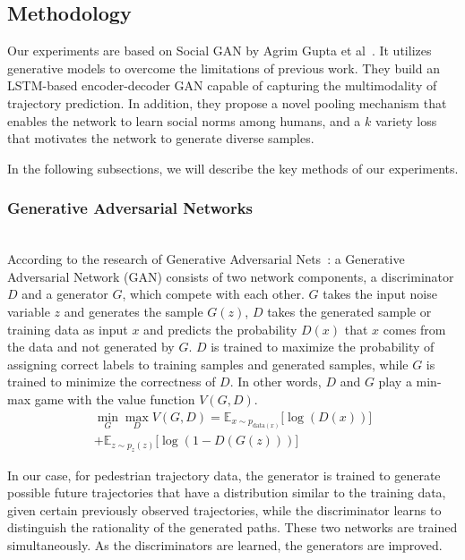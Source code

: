\subsection{Methodology}

Our experiments are based on Social GAN by Agrim Gupta et al~\cite{Gupta_2018_CVPR}. It utilizes generative models to overcome the limitations of previous work. They build an LSTM-based encoder-decoder GAN capable of capturing the multimodality of trajectory prediction. In addition, they propose a novel pooling mechanism that enables the network to learn social norms among humans, and a $k$ variety loss that motivates the network to generate diverse samples.

In the following subsections, we will describe the key methods of our experiments.


\subsubsection{Generative Adversarial Networks}
\hfill \\
According to the research of Generative Adversarial Nets~\cite{gan}: a Generative Adversarial Network (GAN) consists of two network components, a discriminator $D$ and a generator $G$, which compete with each other. $G$ takes the input noise variable $z$ and generates the sample $G(z)$, $D$ takes the generated sample or training data as input $x$ and predicts the probability $D(x)$ that $x$ comes from the data and not generated by $G$. $D$ is trained to maximize the probability of assigning correct labels to training samples and generated samples, while $G$ is trained to minimize the correctness of $D$. In other words, $D$ and $G$ play a min-max game with the value function $V(G, D)$.
\begin{multline}
  \min_{G} \max_{D} V(G, D) = \mathbb{E}_{x \sim p_{\text{data}(x)}} \lbrack \log(D(x))\rbrack \\ + \mathbb{E}_{z \sim p_{z}(z)} \lbrack \log(1 - D(G(z))) \rbrack
\end{multline}


In our case, for pedestrian trajectory data, the generator is trained to generate possible future trajectories that have a distribution similar to the training data, given certain previously observed trajectories, while the discriminator learns to distinguish the rationality of the generated paths. These two networks are trained simultaneously. As the discriminators are learned, the generators are improved.


